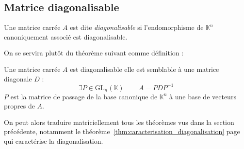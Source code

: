 \documentclass[11pt,a4paper,fleqn,pdftex]{report}
\begin{document}
\subsection{Matrice diagonalisable}
\begin{dfn}
     Une matrice carrée $A$ est dite \emph{diagonalisable} si l'endomorphisme de $\mathbb{K}^n$ canoniquement associé est diagonalisable.
\end{dfn}
On se servira plutôt du théorème suivant comme définition :
\begin{itheorem}
      Une matrice carrée $A$ est diagonalisable \ssi{} elle est semblable à une matrice diagonale $D$ : 
     \begin{equation}
      \exists P\in \mathrm{GL}_n(\mathbb{K})\, \qquad A = PDP^{-1}
      \end{equation} 
      $P$ est la matrice de passage de la base canonique de $\mathbb{K}^n$ à une base de vecteurs propres de $A$.
\end{itheorem}
On peut alors traduire matriciellement tous les théorèmes vus dans la section précédente, notamment le théorème~\ref{thm:caracterisation_diagonalisation} page~\pageref{thm:caracterisation_diagonalisation} qui caractérise la diagonalisation.
\end{document}
